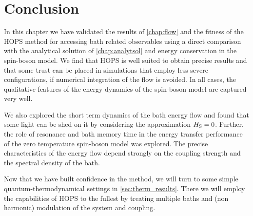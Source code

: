 \section{Conclusion}%
\label{sec:conclusion-1}
In this chapter we have validated the results of \cref{chap:flow} and
the fitness of the HOPS method for accessing bath related observables
using a direct comparison with the analytical solution of
\cref{chap:analytsol} and energy conservation in the spin-boson
model. We find that HOPS is well suited to obtain precise results
and that some trust can be placed in simulations that employ less
severe configurations, if numerical integration of the flow is
avoided. In all cases, the qualitative features of the energy
dynamics of the spin-boson model are captured very well.

We also explored the short term dynamics of the bath energy flow and
found that some light can be shed on it by considering the
approximation \(H_{\mathrm{S}} = 0\). Further, the role of resonance and
bath memory time in the energy transfer performance of the zero
temperature spin-boson model was explored. The precise characteristics
of the energy flow depend strongly on the coupling strength and the
spectral density of the bath.

Now that we have built confidence in the method, we will turn to some
simple quantum-thermodynamical settings in
\cref{sec:therm_results}. There we will employ the capabilities of
HOPS to the fullest by treating multiple baths and (non harmonic)
modulation of the system and coupling.
